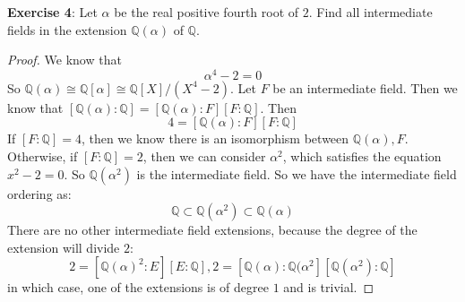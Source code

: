 \documentclass{article}
\begin{document}
\textbf{Exercise 4}: Let $\alpha$ be the real positive fourth root of $2$. Find all intermediate fields in the extension $\mathbb{Q}(\alpha)$ of $\mathbb{Q}$.
    \begin{proof}
        We know that
            \begin{equation*}
                \alpha^{4} - 2 = 0
            \end{equation*}
        So $\mathbb{Q}(\alpha) \cong \mathbb{Q}[\alpha] \cong \mathbb{Q}[X]/(X^{4} - 2)$. Let $F$ be an intermediate field. Then we know that $[\mathbb{Q}(\alpha):\mathbb{Q}] =[\mathbb{Q}(\alpha) : F][F : \mathbb{Q}]$. Then 
            \begin{equation*}
                4 = [\mathbb{Q}(\alpha) : F][F : \mathbb{Q}]
            \end{equation*}
        If $[F : \mathbb{Q}] = 4$, then we know there is an isomorphism between $\mathbb{Q}(\alpha), F$. Otherwise, if $[F : \mathbb{Q}] = 2$, then we can consider $\alpha^{2}$, which satisfies the equation $x^{2} - 2 = 0$. So $\mathbb{Q}(\alpha^{2})$ is the intermediate field. So we have the intermediate field ordering as: 
            \begin{equation*}
                \mathbb{Q} \subset \mathbb{Q}(\alpha^{2}) \subset \mathbb{Q}(\alpha)
            \end{equation*}
        There are no other intermediate field extensions, because the degree of the extension will divide $2$:
            \begin{equation*}
                2 = [\mathbb{Q}(\alpha)^{2} : E][E : \mathbb{Q}], 2 = [\mathbb{Q}(\alpha) : \mathbb{Q}(\alpha^{2}][\mathbb{Q}(\alpha^{2}): \mathbb{Q}]
            \end{equation*}
        in which case, one of the extensions is of degree $1$ and is trivial.
    \end{proof}
\end{document}
